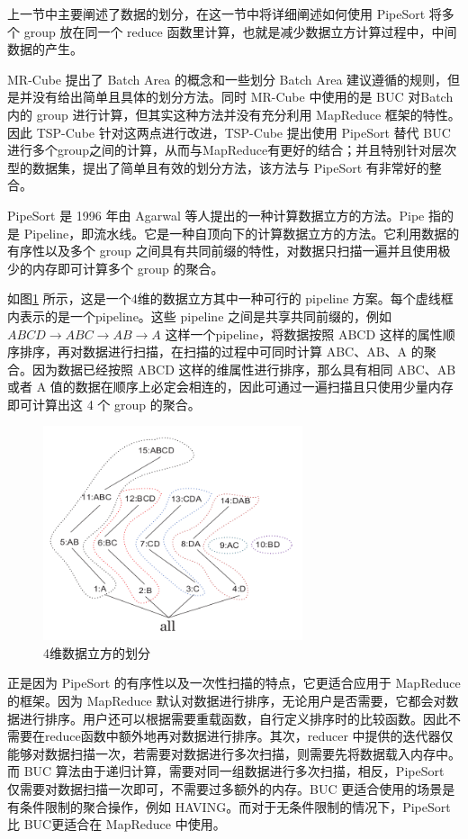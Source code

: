 上一节中主要阐述了数据的划分，在这一节中将详细阐述如何使用 PipeSort 将多个 group 放在同一个 reduce 函数里计算，也就是减少数据立方计算过程中，中间数据的产生。 

MR-Cube 提出了 Batch Area 的概念和一些划分 Batch Area 建议遵循的规则，但是并没有给出简单且具体的划分方法。同时 MR-Cube 中使用的是 BUC 对Batch 内的 group 进行计算，但其实这种方法并没有充分利用 MapReduce 框架的特性。因此 TSP-Cube 针对这两点进行改进，TSP-Cube 提出使用 PipeSort 替代 BUC 进行多个group之间的计算，从而与MapReduce有更好的结合；并且特别针对层次型的数据集，提出了简单且有效的划分方法，该方法与 PipeSort 有非常好的整合。

PipeSort\cite{agarwal1996computation} 是 1996 年由 Agarwal 等人提出的一种计算数据立方的方法。Pipe 指的是 Pipeline，即流水线。它是一种自顶向下的计算数据立方的方法。它利用数据的有序性以及多个 group 之间具有共同前缀的特性，对数据只扫描一遍并且使用极少的内存即可计算多个 group 的聚合。

如图\ref{pipesort} 所示，这是一个4维的数据立方其中一种可行的 pipeline 方案。每个虚线框内表示的是一个pipeline。这些 pipeline 之间是共享共同前缀的，例如 $ABCD\rightarrow ABC\rightarrow AB\rightarrow A$ 这样一个pipeline，将数据按照 ABCD 这样的属性顺序排序，再对数据进行扫描，在扫描的过程中可同时计算 ABC、AB、A 的聚合。因为数据已经按照 ABCD 这样的维属性进行排序，那么具有相同 ABC、AB 或者 A 值的数据在顺序上必定会相连的，因此可通过一遍扫描且只使用少量内存即可计算出这 4 个 group 的聚合。

\begin{figure}[!htb]
\centering\includegraphics[width=3in]{picture/ch_terasort_mr/pipesort} 
\caption{4维数据立方的划分}\label{pipesort} 
\end{figure} 

正是因为 PipeSort 的有序性以及一次性扫描的特点，它更适合应用于 MapReduce 的框架。因为 MapReduce 默认对数据进行排序，无论用户是否需要，它都会对数据进行排序。用户还可以根据需要重载函数，自行定义排序时的比较函数。因此不需要在reduce函数中额外地再对数据进行排序。其次，reducer 中提供的迭代器仅能够对数据扫描一次，若需要对数据进行多次扫描，则需要先将数据载入内存中。而 BUC 算法由于递归计算，需要对同一组数据进行多次扫描，相反，PipeSort 仅需要对数据扫描一次即可，不需要过多额外的内存。BUC 更适合使用的场景是有条件限制的聚合操作，例如 HAVING。而对于无条件限制的情况下，PipeSort 比 BUC更适合在 MapReduce 中使用。

